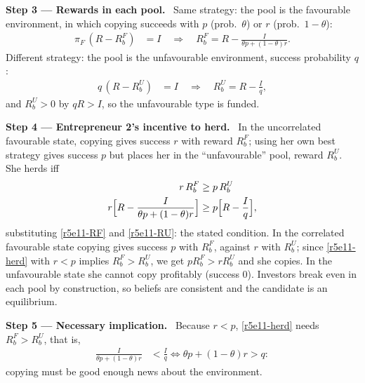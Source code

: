 \documentclass[11pt,a4paper]{article}
\newcommand{\step}[2]{\par\medskip\noindent\textbf{Step #1 --- #2.}~}
\begin{document}
\step{3}{Rewards in each pool} Same strategy: the pool is the favourable environment, in which copying succeeds with $p$ (prob.\ $\theta$) or $r$ (prob.\ $1-\theta$):
\begin{align}
  \pi_F\,(R-R_b^F) &= I \quad\Longrightarrow\quad R_b^F = R - \frac{I}{\theta p+(1-\theta)r}. \label{r5e11-RF}
\end{align}
Different strategy: the pool is the unfavourable environment, success probability $q$:
\begin{align}
  q\,(R-R_b^U) &= I \quad\Longrightarrow\quad R_b^U = R - \frac{I}{q}, \label{r5e11-RU}
\end{align}
and $R_b^U>0$ by $qR>I$, so the unfavourable type is funded.

\step{4}{Entrepreneur 2's incentive to herd} In the uncorrelated favourable state, copying gives success $r$ with reward $R_b^F$; using her own best strategy gives success $p$ but places her in the ``unfavourable'' pool, reward $R_b^U$. She herds iff
\begin{align}
  r\,R_b^F &\ge p\,R_b^U \nonumber\\
  r\Bigl[R - \frac{I}{\theta p+(1-\theta)r}\Bigr] &\ge p\Bigl[R - \frac{I}{q}\Bigr], \label{r5e11-herd}
\end{align}
substituting \eqref{r5e11-RF} and \eqref{r5e11-RU}: the stated condition. In the correlated favourable state copying gives success $p$ with $R_b^F$, against $r$ with $R_b^U$; since \eqref{r5e11-herd} with $r<p$ implies $R_b^F>R_b^U$, we get $pR_b^F>rR_b^U$ and she copies. In the unfavourable state she cannot copy profitably (success 0). Investors break even in each pool by construction, so beliefs are consistent and the candidate is an equilibrium.

\step{5}{Necessary implication} Because $r<p$, \eqref{r5e11-herd} needs $R_b^F>R_b^U$, that is,
\begin{align}
  \frac{I}{\theta p+(1-\theta)r} &< \frac{I}{q} \iff \theta p+(1-\theta)r > q: \nonumber
\end{align}
copying must be good enough news about the environment.
\end{document}
